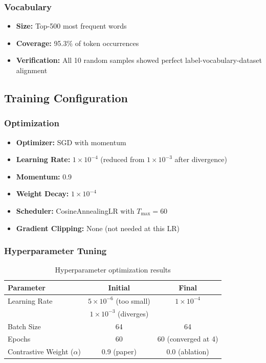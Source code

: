 \documentclass[12pt,a4paper]{article}
\begin{document}
\subsubsection{Vocabulary}
\begin{itemize}
    \item \textbf{Size:} Top-500 most frequent words
    \item \textbf{Coverage:} 95.3\% of token occurrences
    \item \textbf{Verification:} All 10 random samples showed perfect label-vocabulary-dataset alignment
\end{itemize}

\subsection{Training Configuration}

\subsubsection{Optimization}
\begin{itemize}
    \item \textbf{Optimizer:} SGD with momentum
    \item \textbf{Learning Rate:} $1 \times 10^{-4}$ (reduced from $1 \times 10^{-3}$ after divergence)
    \item \textbf{Momentum:} 0.9
    \item \textbf{Weight Decay:} $1 \times 10^{-4}$
    \item \textbf{Scheduler:} CosineAnnealingLR with $T_{\max} = 60$
    \item \textbf{Gradient Clipping:} None (not needed at this LR)
\end{itemize}

\subsubsection{Hyperparameter Tuning}
\begin{table}[H]
\centering
\begin{tabular}{lcc}
\toprule
\textbf{Parameter} & \textbf{Initial} & \textbf{Final} \\
\midrule
Learning Rate & $5 \times 10^{-6}$ (too small) & $1 \times 10^{-4}$ \\
 & $1 \times 10^{-3}$ (diverges) & \\
Batch Size & 64 & 64 \\
Epochs & 60 & 60 (converged at 4) \\
Contrastive Weight ($\alpha$) & 0.9 (paper) & 0.0 (ablation) \\
\bottomrule
\end{tabular}
\caption{Hyperparameter optimization results}
\end{table}
\end{document}
